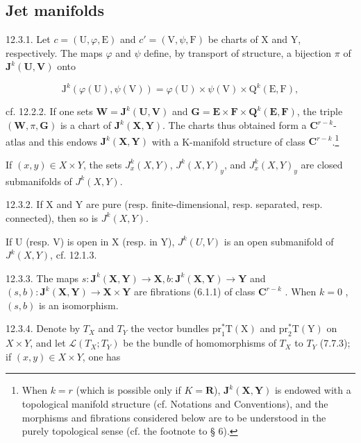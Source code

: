 \subsection{Jet manifolds}

12.3.1. Let \(c = (\mathrm{U}, \varphi, \mathrm{E})\) and \(c' = (\mathrm{V}, \psi, \mathrm{F})\) be charts of X and Y, respectively. The maps \(\varphi\) and \(\psi\) define, by transport of structure, a bijection \(\pi\) of \(\mathbf{J}^k (\mathbf{U},\mathbf{V})\) onto

\[
\mathrm{J} ^ {k} (\varphi (\mathrm{U}), \psi (\mathrm{V})) = \varphi (\mathrm{U}) \times \psi (\mathrm{V}) \times \mathrm{Q} ^ {k} (\mathrm{E}, \mathrm{F}),
\]

cf. 12.2.2. If one sets \(\mathbf{W} = \mathbf{J}^{k}(\mathbf{U},\mathbf{V})\) and \(\mathbf{G} = \mathbf{E}\times \mathbf{F}\times \mathbf{Q}^{k}(\mathbf{E},\mathbf{F})\), the triple \((\mathbf{W},\pi ,\mathbf{G})\) is a chart of \(\mathbf{J}^k (\mathbf{X},\mathbf{Y})\). The charts thus obtained form a \(\mathbf{C}^{r - k}\)-atlas and this endows \(\mathbf{J}^k (\mathbf{X},\mathbf{Y})\) with a K-manifold structure of class \(\mathbf{C}^{r - k}\).\footnote{When \(k=r\) (which is possible only if \(K=\mathbf{R}\)), \(\mathbf{J}^{k}(\mathbf{X},\mathbf{Y})\) is endowed with a topological manifold structure (cf. Notations and Conventions), and the morphisms and fibrations considered below are to be understood in the purely topological sense (cf. the footnote to § 6).}

If \((x, y) \in X \times Y\), the sets \(J_{x}^{k}(X, Y)\), \(J^{k}(X, Y)_{y}\), and \(J_{x}^{k}(X, Y)_{y}\) are closed submanifolds of \(J^{k}(X, Y)\).

12.3.2. If X and Y are pure (resp. finite-dimensional, resp. separated, resp. connected), then so is \(J^{k}(X, Y)\).

If U (resp. V) is open in X (resp. in Y), \(J^{k}(U, V)\) is an open submanifold of \(J^{k}(X, Y)\), cf. 12.1.3.

12.3.3. The maps \(s: \mathbf{J}^{k}(\mathbf{X}, \mathbf{Y}) \to \mathbf{X}, b: \mathbf{J}^{k}(\mathbf{X}, \mathbf{Y}) \to \mathbf{Y}\) and \((s, b): \mathbf{J}^{k}(\mathbf{X}, \mathbf{Y}) \to \mathbf{X} \times \mathbf{Y}\) are fibrations (6.1.1) of class \(\mathbf{C}^{r - k}\) . When \(k = 0\) , \((s, b)\) is an isomorphism.

12.3.4. Denote by \(T_{X}\) and \(T_{Y}\) the vector bundles \(\mathrm{pr}_{1}^{*}\mathrm{T}(\mathrm{X})\) and \(\mathrm{pr}_{2}^{*}\mathrm{T}(\mathrm{Y})\) on \(X \times Y\), and let \(\mathcal{L}(T_{X}; T_{Y})\) be the bundle of homomorphisms of \(T_{X}\) to \(T_{Y}\) (7.7.3); if \((x, y) \in X \times Y\), one has


